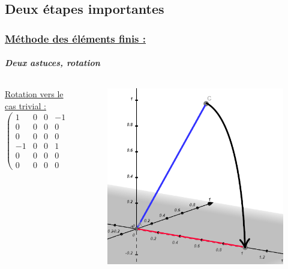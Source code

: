 \documentclass[10pt]{beamer}
\begin{document}
	\subsection{Deux \'etapes importantes}
	\begin{frame}
		\frametitle{\uline{M\'ethode des \'el\'ements finis :}}
		\framesubtitle{\textit{Deux astuces, rotation}}
		\begin{columns}[t]
			\begin{column}{5cm}
				\begin{block}{}
					\uline{Rotation vers le cas trivial :}
  					\begin{equation}
						\begin{pmatrix}
							1 & 0 & 0 & -1 & 0 & 0 \\
							0 & 0 & 0 & 0 & 0 & 0 \\
							0 & 0 & 0 & 0 & 0 & 0 \\
							-1 & 0 & 0 & 1 & 0 & 0 \\
							0 & 0 & 0 & 0 & 0 & 0 \\
							0 & 0 & 0 & 0 & 0 & 0
						\end{pmatrix}
					\end{equation}
				\end{block}
  			\end{column}
 			\begin{column}{5cm}
 				\begin{figure}
 				 	\includegraphics[scale=0.35]{Images/CasFinal.png}
 				\end{figure}
			\end{column}
 		\end{columns}
	\end{frame}
\end{document}
